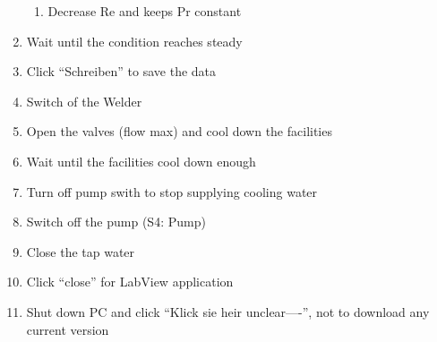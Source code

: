 \documentclass[conference]{IEEEtran}
\begin{document}
\begin{enumerate}
\begin{enumerate}
      \item Decrease Re and keeps Pr constant\\
      
  \end{enumerate}
  \item Wait until the condition reaches steady
  \item Click ``Schreiben'' to save the data
  \item Switch of the Welder
  \item Open the valves (flow max) and cool down the facilities
  \item Wait until the facilities cool down enough
  \item Turn off pump swith to stop supplying cooling water
  \item Switch off the pump (S4: Pump)
  \item Close the tap water
  \item Click ``close'' for LabView application
  \item Shut down PC and click ``Klick sie heir unclear----'', not to download any current version
\end{enumerate}
\end{document}
